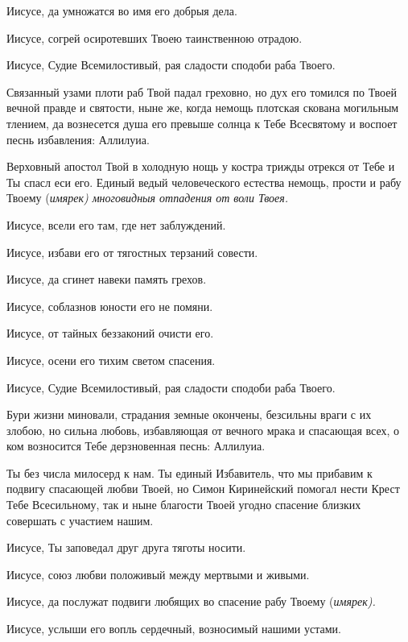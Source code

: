 Иисусе, да умножатся во имя его добрыя дела. 

Иисусе, согрей осиротевших Твоею таинственною отрадою. 

Иисусе, Судие Всемилостивый, рая сладости сподоби раба Твоего.




Связанный узами плоти раб Твой падал греховно, но дух его томился по Твоей вечной правде и святости, ныне же, когда немощь плотская скована могильным тлением, да вознесется душа его превыше солнца к Тебе Всесвятому и воспоет песнь избавления: Аллилуиа.




Верховный апостол Твой в холодную нощь у костра трижды отрекся от Тебе и Ты спасл еси его. Единый ведый человеческого естества немощь, прости и рабу Твоему (\itshape имярек\normalfont{}) многовидныя отпадения от воли Твоея. 

Иисусе, всели его там, где нет заблуждений. 

Иисусе, избави его от тягостных терзаний совести. 

Иисусе, да сгинет навеки память грехов. 

Иисусе, соблазнов юности его не помяни. 

Иисусе, от тайных беззаконий очисти его. 

Иисусе, осени его тихим светом спасения. 

Иисусе, Судие Всемилостивый, рая сладости сподоби раба Твоего.




Бури жизни миновали, страдания земные окончены, безсильны враги с их злобою, но сильна любовь, избавляющая от вечного мрака и спасающая всех, о ком возносится Тебе дерзновенная песнь: Аллилуиа.




Ты без числа милосерд к нам. Ты единый Избавитель, что мы прибавим к подвигу спасающей любви Твоей, но Симон Киринейский помогал нести Крест Тебе Всесильному, так и ныне благости Твоей угодно спасение близких совершать с участием нашим. 

Иисусе, Ты заповедал друг друга тяготы носити. 

Иисусе, союз любви положивый между мертвыми и живыми. 

Иисусе, да послужат подвиги любящих во спасение рабу Твоему (\itshape имярек\normalfont{}). 

Иисусе, услыши его вопль сердечный, возносимый нашими устами. 


